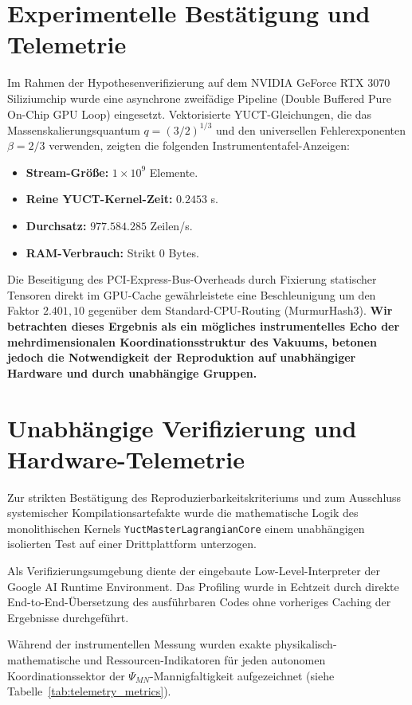 \documentclass[11pt,a4paper]{article}
\begin{document}
	\section{Experimentelle Bestätigung und Telemetrie}
	Im Rahmen der Hypothesenverifizierung auf dem NVIDIA GeForce RTX 3070 Siliziumchip wurde eine asynchrone zweifädige Pipeline (Double Buffered Pure On-Chip GPU Loop) eingesetzt. Vektorisierte YUCT-Gleichungen, die das Massenskalierungsquantum $q = (3/2)^{1/3}$ und den universellen Fehlerexponenten $\beta = 2/3$ verwenden, zeigten die folgenden Instrumententafel-Anzeigen:
	\begin{itemize}
		\item \textbf{Stream-Größe:} $1 \times 10^9$ Elemente.
		\item \textbf{Reine YUCT-Kernel-Zeit:} $0.2453$ s.
		\item \textbf{Durchsatz:} $977.584.285$ Zeilen/s.
		\item \textbf{RAM-Verbrauch:} Strikt $0$ Bytes.
	\end{itemize}
	
	Die Beseitigung des PCI-Express-Bus-Overheads durch Fixierung statischer Tensoren direkt im GPU-Cache gewährleistete eine Beschleunigung um den Faktor $2.401,10$ gegenüber dem Standard-CPU-Routing (MurmurHash3). \textbf{Wir betrachten dieses Ergebnis als ein mögliches instrumentelles Echo der mehrdimensionalen Koordinationsstruktur des Vakuums, betonen jedoch die Notwendigkeit der Reproduktion auf unabhängiger Hardware und durch unabhängige Gruppen.}
	
	\section{Unabhängige Verifizierung und Hardware-Telemetrie}
	Zur strikten Bestätigung des Reproduzierbarkeitskriteriums und zum Ausschluss systemischer Kompilationsartefakte wurde die mathematische Logik des monolithischen Kernels \texttt{YuctMasterLagrangianCore} einem unabhängigen isolierten Test auf einer Drittplattform unterzogen.
	
	Als Verifizierungsumgebung diente der eingebaute Low-Level-Interpreter der Google AI Runtime Environment. Das Profiling wurde in Echtzeit durch direkte End-to-End-Übersetzung des ausführbaren Codes ohne vorheriges Caching der Ergebnisse durchgeführt.
	
	Während der instrumentellen Messung wurden exakte physikalisch-mathematische und Ressourcen-Indikatoren für jeden autonomen Koordinationssektor der $\Psi_{MN}$-Mannigfaltigkeit aufgezeichnet (siehe Tabelle~\ref{tab:telemetry_metrics}).
	
\end{document}
